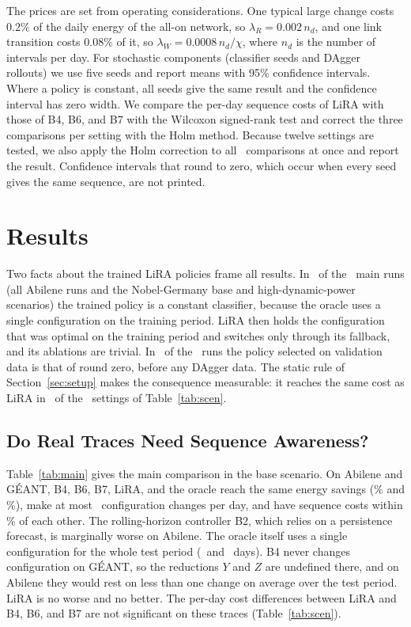 \documentclass[5p,times]{elsarticle}
\begin{document}
The prices are set from operating considerations. One typical large change costs $0.2\%$ of the daily energy of the all-on network, so $\lambda_R=0.002\,n_d$, and one link transition costs $0.08\%$ of it, so $\lambda_W=0.0008\,n_d/\chi$, where $n_d$ is the number of intervals per day. For stochastic components (classifier seeds and DAgger rollouts) we use five seeds and report means with 95\% confidence intervals. Where a policy is constant, all seeds give the same result and the confidence interval has zero width. We compare the per-day sequence costs of LiRA with those of B4, B6, and B7 with the Wilcoxon signed-rank test and correct the three comparisons per setting with the Holm method. Because twelve settings are tested, we also apply the Holm correction to all \globalTests\ comparisons at once and report the result. Confidence intervals that round to zero, which occur when every seed gives the same sequence, are not printed.

\section{Results}\label{sec:results}

Two facts about the trained LiRA policies frame all results. In \liraConstRuns\ of the \liraTotalRuns\ main runs (all Abilene runs and the Nobel-Germany base and high-dynamic-power scenarios) the trained policy is a constant classifier, because the oracle uses a single configuration on the training period. LiRA then holds the configuration that was optimal on the training period and switches only through its fallback, and its ablations are trivial. In \daggerRoundZero\ of the \daggerRuns\ runs the policy selected on validation data is that of round zero, before any DAgger data. The static rule of Section~\ref{sec:setup} makes the consequence measurable: it reaches the same cost as LiRA in \staticSame\ of the \staticTotal\ settings of Table~\ref{tab:scen}.

\subsection{Do Real Traces Need Sequence Awareness?}\label{sec:res-main}

Table~\ref{tab:main} gives the main comparison in the base scenario. On Abilene and G\'{E}ANT, B4, B6, B7, LiRA, and the oracle reach the same energy savings (\abiSav\% and \geaSav\%), make at most \abiBFourchg\ configuration changes per day, and have sequence costs within \realSpread\% of each other. The rolling-horizon controller B2, which relies on a persistence forecast, is marginally worse on Abilene. The oracle itself uses a single configuration for the whole test period (\abiTestDays\ and \geaTestDays\ days). B4 never changes configuration on G\'{E}ANT, so the reductions $Y$ and $Z$ are undefined there, and on Abilene they would rest on less than one change on average over the test period. LiRA is no worse and no better. The per-day cost differences between LiRA and B4, B6, and B7 are not significant on these traces (Table~\ref{tab:scen}).
\end{document}
